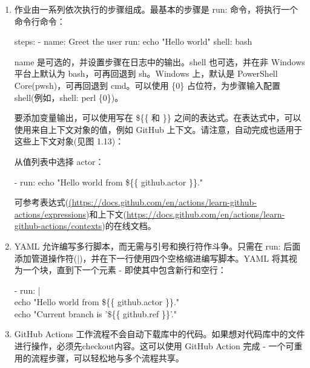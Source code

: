 \begin{enumerate}
\item 
作业由一系列依次执行的步骤组成。最基本的步骤是 run: 命令，将执行一个命令行命令：

\begin{shell}
steps:
  - name: Greet the user
    run: echo "Hello world"
    shell: bash
\end{shell}

name 是可选的，并设置步骤在日志中的输出。shell 也可选，并在非 Windows 平台上默认为 bash，可再回退到 sh。Windows 上，默认是 PowerShell Core(pwsh)，可再回退到 cmd。可以使用 \{0\} 占位符，为步骤输入配置 shell(例如，shell: perl \{0\})。

要添加变量输出，可以使用写在 \$\{\{ 和 \}\} 之间的表达式。在表达式中，可以使用来自上下文对象的值，例如 GitHub 上下文。请注意，自动完成也适用于这些上下文对象(见图 1.13)：


从值列表中选择 actor：

\begin{tcolorbox}[ breakable,colback = bashcodebg, colframe= black!50!white]
\scriptsize{
- run: echo "Hello world  from \$\{\{ github.actor \}\}."
}
\end{tcolorbox}

可参考表达式(\url{(https://docs.github.com/en/actions/learn-github-actions/expressions})和上下文(\url{https://docs.github.com/en/actions/learn-github-actions/contexts})的在线文档。

\item 
YAML 允许编写多行脚本，而无需与引号和换行符作斗争。只需在 run: 后面添加管道操作符(|)，并在下一行使用四个空格缩进编写脚本。YAML 将其视为一个块，直到下一个元素 - 即使其中包含新行和空行：

\begin{tcolorbox}[ breakable,colback = bashcodebg, colframe= black!50!white]
\scriptsize{
- run: | \\
\hspace*{2em}echo "Hello world  from \$\{\{ github.actor \}\}." \\
\hspace*{2em}echo "Current branch is '\$\{\{ github.ref \}\}'."
}
\end{tcolorbox}

\item 
GitHub Actions 工作流程不会自动下载库中的代码。如果想对代码库中的文件进行操作，必须先checkout内容。这可以使用 GitHub Action 完成 - 一个可重用的流程步骤，可以轻松地与多个流程共享。


\end{enumerate}
